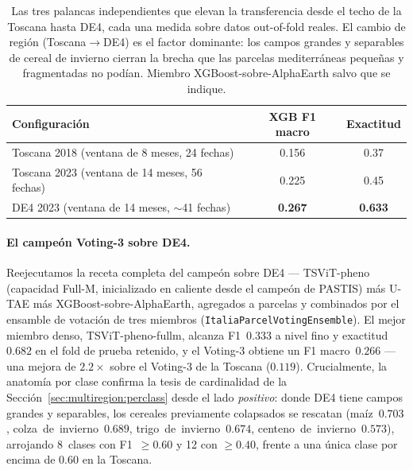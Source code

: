 \begin{table}[t]
  \centering
  \caption{Las tres palancas independientes que elevan la transferencia
  desde el techo de la Toscana hasta DE4, cada una medida sobre datos
  out-of-fold reales. El cambio de región (Toscana$\rightarrow$DE4) es el
  factor dominante: los campos grandes y separables de cereal de invierno
  cierran la brecha que las parcelas mediterráneas pequeñas y fragmentadas
  no podían. Miembro XGBoost-sobre-AlphaEarth salvo que se indique.}
  \label{tab:de4_levers}
  \begin{tabular}{lcc}
    \toprule
    Configuración & XGB F1 macro & Exactitud \\
    \midrule
    Toscana 2018 (ventana de 8 meses, 24 fechas)   & 0.156 & 0.37 \\
    Toscana 2023 (ventana de 14 meses, 56 fechas)  & 0.225 & 0.45 \\
    DE4 2023 (ventana de 14 meses, $\sim$41 fechas) & \textbf{0.267} & \textbf{0.633} \\
    \bottomrule
  \end{tabular}
\end{table}

\paragraph{El campeón Voting-3 sobre DE4.}
Reejecutamos la receta completa del campeón sobre DE4 --- TSViT-pheno
(capacidad Full-M, inicializado en caliente desde el campeón de PASTIS)
más U-TAE más XGBoost-sobre-AlphaEarth, agregados a parcelas y
combinados por el ensamble de votación de tres miembros
(\texttt{ItaliaParcelVotingEnsemble}). El mejor miembro denso,
TSViT-pheno-fullm, alcanza F1~$0.333$ a nivel fino y exactitud~$0.682$ en
el fold de prueba retenido, y el Voting-3 obtiene un F1
macro~$0.266$ %
--- una mejora de $2.2\times$ sobre el Voting-3 de la Toscana ($0.119$).
Crucialmente, la anatomía por clase confirma la tesis de cardinalidad de
la Sección~\ref{sec:multiregion:perclass} desde el lado \emph{positivo}:
donde DE4 tiene campos grandes y separables, los cereales previamente
colapsados se rescatan (maíz~$0.703$, colza~de~invierno~$0.689$,
trigo~de~invierno~$0.674$, centeno~de~invierno~$0.573$), arrojando
8~clases con F1~$\ge0.60$ y 12 con $\ge0.40$, frente a una única clase
por encima de $0.60$ en la Toscana. %

